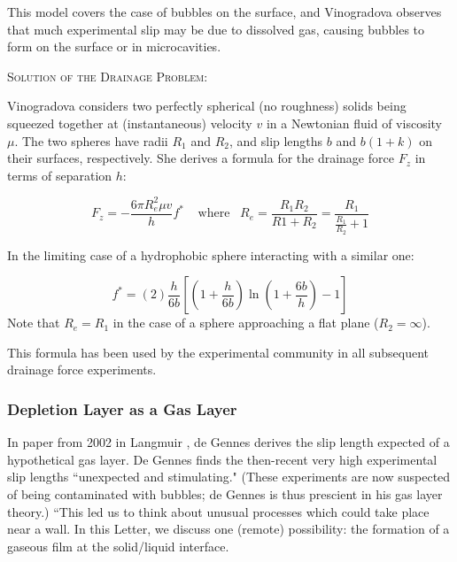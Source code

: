 \documentclass[12pt, a4paper, twoside, openright]{book}
\newcommand{\paper}[1]
         {\colorbox[gray]{0.8}{ \textsc{#1}}
         
         }
\begin{document}

This model covers the case of bubbles on the surface, and Vinogradova observes that much experimental slip may be due to dissolved gas, causing bubbles to form on the surface or in microcavities.

\clearpage
\paper{Solution of the Drainage Problem:}
Vinogradova considers two perfectly spherical (no roughness) solids being squeezed together at (instantaneous) velocity $v$ in a Newtonian fluid of viscosity $\mu$. The two spheres have radii $R_{1}$ and $R_{2}$, and slip lengths $b$ and $b(1+k)$ on their surfaces, respectively. 
She derives a formula for the drainage force
$F_{z}$ in terms of separation $h$:

\begin{equation}
F_{z} = - \frac{6 \pi R_{e}^{2} \mu v}{h} f^{*}
 \;\;\;\; \mathrm{where}\;\;\;R_{e} = \frac{R_{1}R_{2}}{R{1}+R_{2}} = 
 \frac{R_{1}}{\frac{R_{1}}{R_{2}} + 1}
\end{equation} 

 In the limiting case of a hydrophobic sphere interacting with a similar one:
 
\begin{equation}
f^{*} = (2)\frac{h}{6b} \left[ \left(1 + \frac{h}{6b} \right)
 \ln \left(1 + \frac{6b}{h} \right) - 1 \right]
\end{equation}
Note that $R_{e} = R_{1}$ in the case of a sphere approaching a flat plane ($R_{2}=\infty$).

This formula has been used by the experimental community in all subsequent drainage force experiments.

\subsubsection{Depletion Layer as a Gas Layer}

In paper from 2002 in Langmuir \cite{deGennes2002}, de Gennes derives the slip length expected of a hypothetical gas layer.  De Gennes finds the then-recent very high experimental slip lengths ``unexpected and stimulating."  (These experiments are now suspected of being contaminated with bubbles; de Gennes is thus prescient in his gas layer theory.) ``This led us to think about unusual processes which could take place near a wall.  In this Letter, we discuss one (remote) possibility: the formation of a gaseous film at the solid/liquid interface.
\end{document}
